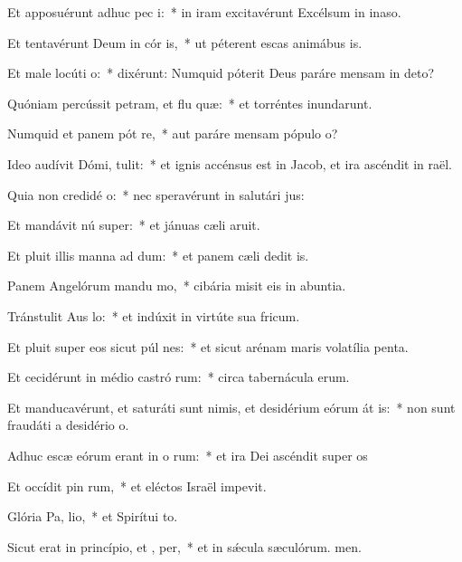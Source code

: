 \item Et apposuérunt adhuc pec i:~* in iram excitavérunt Excélsum in inaso.
\item Et tentavérunt Deum in cór is,~* ut péterent escas animábus is.
\item Et male locúti   o:~* dixérunt: Numquid póterit Deus paráre mensam in deto?
\item Quóniam percússit petram, et flu quæ:~* et torréntes inundarunt.
\item Numquid et panem pót re,~* aut paráre mensam pópulo o?
\item Ideo audívit Dómi,  tulit:~* et ignis accénsus est in Jacob, et ira ascéndit in raël.
\item Quia non credidé  o:~* nec speravérunt in salutári jus:
\item Et mandávit nú super:~* et jánuas cæli aruit.
\item Et pluit illis manna ad dum:~* et panem cæli dedit is.
\item Panem Angelórum mandu mo,~* cibária misit eis in abuntia.
\item Tránstulit Aus  lo:~* et indúxit in virtúte sua fricum.
\item Et pluit super eos sicut púl nes:~* et sicut arénam maris volatília penta.
\item Et cecidérunt in médio castró rum:~* circa tabernácula erum.
\item Et manducavérunt, et saturáti sunt nimis, et desidérium eórum át is:~* non sunt fraudáti a desidério o.
\item Adhuc escæ eórum erant in o rum:~* et ira Dei ascéndit super os
\item Et occídit pin rum,~* et eléctos Israël impevit.
\item Glória Pa,  lio,~* et Spirítui to.
\item Sicut erat in princípio, et ,  per,~* et in sǽcula sæculórum. men.
